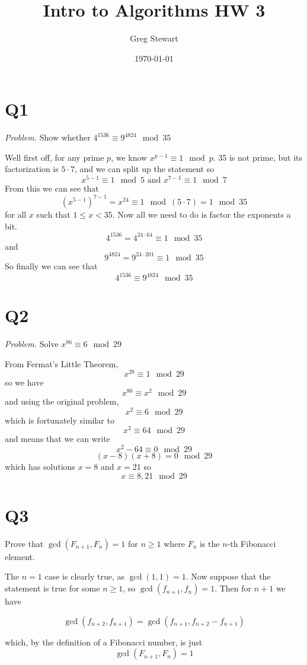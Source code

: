 \documentclass{article}
\title{Intro to Algorithms HW 3}
\author{Greg Stewart}
\date{\today}
\begin{document}
\maketitle

\section*{Q1}

\textit{Problem.} Show whether $4^{1536} \equiv 9^{4824} \mod 35$

Well first off, for any prime $p$, we know $x^{p-1} \equiv 1 \mod p$. 35 is not prime, but its factorization is $5 \cdot 7$, and we can split up the statement so $$x^{5-1} \equiv 1 \mod 5 \text{ and } x^{7-1} \equiv 1 \mod 7$$ From this we can see that $$(x^{5-1})^{7-1} = x^{24} \equiv 1 \mod (5\cdot 7) = 1 \mod 35$$ for all $x$ such that $1 \leq x < 35$. Now all we need to do is factor the exponents a bit. $$4^{1536} = 4^{24 \cdot 64} \equiv 1 \mod 35$$ and $$9^{4824} = 9 ^{24 \cdot 201} \equiv 1 \mod 35$$ So finally we can see that $$4^{1536} \equiv 9^{4824} \mod 35$$


\section*{Q2}

\textit{Problem.} Solve $x^{86} \equiv 6 \mod 29$

From Fermat's Little Theorem, $$x^{28} \equiv 1 \mod 29$$ so we have $$x^{86} \equiv x^{2} \mod 29$$ and using the original problem, $$x^2 \equiv 6 \mod 29$$ which is fortunately similar to $$x^2 \equiv 64 \mod 29$$ and means that we can write $$x^2 - 64 \equiv 0 \mod 29$$ $$(x-8)(x+8) = 0 \mod 29$$ which has solutions $x = 8$ and $x = 21$ so $$x \equiv 8, 21 \mod 29$$ 

\section*{Q3}

Prove that $\gcd(F_{n+1}, F_n) = 1$ for $n \geq 1$ where $F_n$ is the $n$-th Fibonacci element.

The $n=1$ case is clearly true, as $\gcd (1,1) = 1$. Now suppose that the statement is true for some $n \geq 1$, so $\gcd (f_{n+1}, f_n) = 1$. Then for $n+1$ we have

$$\gcd (f_{n+2}, f_{n+1}) = \gcd (f_{n+1}, f_{n+2} - f_{n+1})$$ 

which, by the definition of a Fibonacci number, is just $$\gcd (F_{n+1}, F_n) = 1$$
\end{document}
